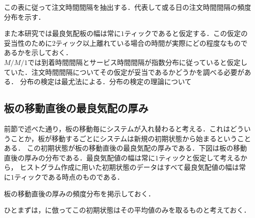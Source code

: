 \documentclass[a4j,papersize,disablejfam,slide,14pt]{jsarticle}
\begin{document}
    この表に従って注文時間間隔を抽出する．代表して或る日の注文時間間隔の頻度分布を示す．
    
    また本研究では最良気配板の幅は常に$1$ティックであると仮定する．この仮定の妥当性のために$2$ティック以上離れている場合の時間が実際にどの程度なものであるかを示しておく．\\
    
    $M/M/1$では到着時間間隔とサービス時間間隔が指数分布に従っていると仮定していた．注文時間間隔についてその仮定が妥当であるかどうかを調べる必要がある．
    分布の検定は最尤法による．分布の検定の理論について%

\subsection{板の移動直後の最良気配の厚み}
	前節で述べた通り，板の移動毎にシステムが入れ替わると考える．これはどういうことか，板が移動するごとにシステムは新規の初期状態から始まるということある．
    この初期状態が板の移動直後の最良気配の厚みである．下図は板の移動直後の厚みの分布である．最良気配値の幅は常に$1$ティックと仮定して考えるから，
    ヒストグラム作成に用いた初期状態のデータはすべて最良気配値の幅は常に$1$ティックである時点のものである．
    
    板の移動直後の厚みの頻度分布を掲示しておく．
    
    ひとまずは，\cite{li_hui_endo_kishimoto}に倣ってこの初期状態はその平均値のみを取るものと考えておく．
\end{document}
